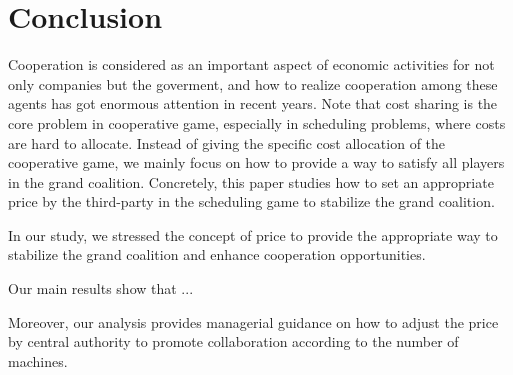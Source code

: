 \section{Conclusion}

Cooperation is considered as an important aspect of economic activities for not only companies but the goverment, and how to realize cooperation among these agents has got enormous attention in recent years.
Note that cost sharing is the core problem in
cooperative game, especially in scheduling problems, where costs are hard to allocate.
Instead of giving the specific cost allocation of the cooperative game, we mainly focus on how to provide a way to satisfy all players in the grand coalition.
Concretely, this paper studies how to set an appropriate price by the third-party in the scheduling game to stabilize the grand coalition.

In our study, we stressed the concept of price to provide the appropriate way to stabilize the grand coalition and enhance cooperation opportunities.

Our main results show that ...

Moreover, our analysis provides managerial guidance on how to adjust the price by central authority to
promote collaboration according to the number of machines.
